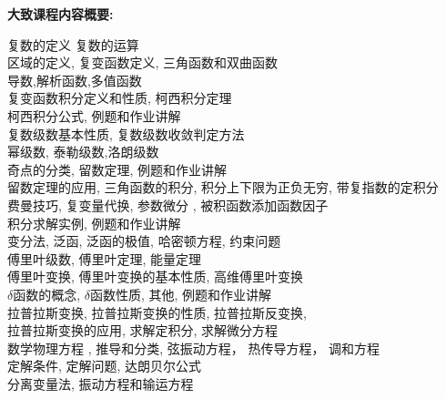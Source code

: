 \documentclass[11pt, a4paper]{article}
\begin{document}
\noindent \textbf{大致课程内容概要:}
\begin{center} 
\begin{minipage}{5in}
\begin{flushleft}
{\color{darkgreen}{\Rectangle}} 复数的定义
复数的运算 	
\\
{\color{darkgreen}{\Rectangle}} 区域的定义, 复变函数定义, 三角函数和双曲函数
\\
{\color{darkgreen}{\Rectangle}}
导数,解析函数,多值函数 
\\
{\color{red}{\Rectangle}}
复变函数积分定义和性质, 柯西积分定理  
\\
{\color{darkgreen}{\Rectangle}}
柯西积分公式,
例题和作业讲解 
\\
{\color{darkgreen}{\Rectangle}}
复数级数基本性质,
复数级数收敛判定方法
\\
{\color{red}{\Rectangle}}
幂级数,
泰勒级数,洛朗级数
\\
{\color{darkgreen}{\Rectangle}}
奇点的分类,
留数定理,
例题和作业讲解  
\\
{\color{red}{\Rectangle}}
留数定理的应用, 三角函数的积分,
积分上下限为正负无穷,
带复指数的定积分  
\\
{\color{darkgreen}{\Rectangle}}
费曼技巧,
复变量代换,
参数微分 ,
被积函数添加函数因子
\\
{\color{darkgreen}{\Rectangle}}
积分求解实例,
例题和作业讲解 
\\
{\color{darkgreen}{\Rectangle}}
变分法,
泛函,
泛函的极值,
哈密顿方程,
约束问题
\\
{\color{red}{\Rectangle}}
傅里叶级数,
傅里叶定理,
能量定理
\\
{\color{red}{\Rectangle}}
傅里叶变换,
傅里叶变换的基本性质,
高维傅里叶变换
\\
{\color{darkgreen}{\Rectangle}}
$\delta$函数的概念,
$\delta$函数性质,
其他,
例题和作业讲解
\\
{\color{darkgreen}{\Rectangle}}
拉普拉斯变换,
拉普拉斯变换的性质,
拉普拉斯反变换,
\\
{\color{darkgreen}{\Rectangle}}
拉普拉斯变换的应用,
求解定积分,
求解微分方程
\\
{\color{darkgreen}{\Rectangle}}
数学物理方程 ,
推导和分类,
弦振动方程，
热传导方程，
调和方程
\\
{\color{red}{\Rectangle}}
定解条件,
定解问题,
达朗贝尔公式
\\
{\color{red}{\Rectangle}}
分离变量法,
振动方程和输运方程
\\
{\color{darkgreen}{\Rectangle}}

\end{flushleft}
\end{minipage}
\end{center}
\end{document}
